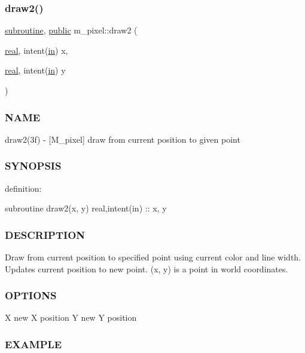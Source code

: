 \subsubsection{\texorpdfstring{draw2()}{draw2()}}
{\footnotesize\ttfamily \hyperlink{M__stopwatch_83_8txt_acfbcff50169d691ff02d4a123ed70482}{subroutine}, \hyperlink{M__stopwatch_83_8txt_a2f74811300c361e53b430611a7d1769f}{public} m\+\_\+pixel\+::draw2 (\begin{DoxyParamCaption}\item[{\hyperlink{read__watch_83_8txt_abdb62bde002f38ef75f810d3a905a823}{real}, intent(\hyperlink{M__journal_83_8txt_afce72651d1eed785a2132bee863b2f38}{in})}]{x,  }\item[{\hyperlink{read__watch_83_8txt_abdb62bde002f38ef75f810d3a905a823}{real}, intent(\hyperlink{M__journal_83_8txt_afce72651d1eed785a2132bee863b2f38}{in})}]{y }\end{DoxyParamCaption})}



\subsubsection*{N\+A\+ME}

draw2(3f) -\/ \mbox{[}M\+\_\+pixel\mbox{]} draw from current position to given point 

\subsubsection*{S\+Y\+N\+O\+P\+S\+IS}

definition\+:

subroutine draw2(x, y) real,intent(in) \+:\+: x, y

\subsubsection*{D\+E\+S\+C\+R\+I\+P\+T\+I\+ON}

Draw from current position to specified point using current color and line width. Updates current position to new point. (x, y) is a point in world coordinates.

\subsubsection*{O\+P\+T\+I\+O\+NS}

X new X position Y new Y position

\subsubsection*{E\+X\+A\+M\+P\+LE}

